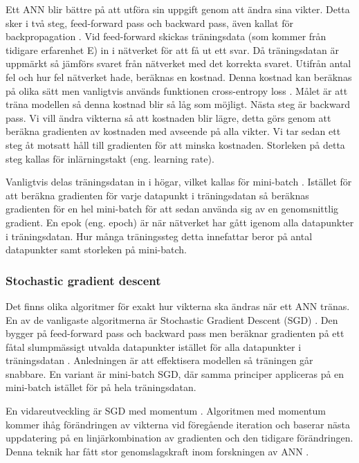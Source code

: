\documentclass[]{kththesis}
\begin{document}
Ett ANN blir bättre på att utföra sin uppgift genom att ändra sina vikter. Detta sker i två steg, feed-forward pass och backward pass, även kallat för backpropagation \parencite{alpaydin2009introduction}. Vid feed-forward skickas träningsdata (som kommer från tidigare erfarenhet E) in i nätverket för att få ut ett svar. Då träningsdatan är uppmärkt så jämförs svaret från nätverket med det korrekta svaret. Utifrån antal fel och hur fel nätverket hade, beräknas en kostnad. Denna kostnad kan beräknas på olika sätt men vanligtvis används funktionen cross-entropy loss \parencite{Goodfellow-et-al-2016}. Målet är att träna modellen så denna kostnad blir så låg som möjligt. Nästa steg är backward pass. Vi vill ändra vikterna så att kostnaden blir lägre, detta görs genom att beräkna gradienten av kostnaden med avseende på alla vikter. Vi tar sedan ett steg åt motsatt håll till gradienten för att minska kostnaden. Storleken på detta steg kallas för inlärningstakt (eng. learning rate).

Vanligtvis delas träningsdatan in i högar, vilket kallas för mini-batch \parencite{Goodfellow-et-al-2016}. Istället för att beräkna gradienten för varje datapunkt i träningsdatan så beräknas gradienten för en hel mini-batch för att sedan använda sig av en genomsnittlig gradient. En epok (eng. epoch) är när nätverket har gått igenom alla datapunkter i träningsdatan. Hur många träningssteg detta innefattar beror på antal datapunkter samt storleken på mini-batch.

\subsubsection{Stochastic gradient descent}
Det finns olika algoritmer för exakt hur vikterna ska ändras när ett ANN tränas. En av de vanligaste algoritmerna är Stochastic Gradient Descent (SGD) \parencite{Goodfellow-et-al-2016}. Den bygger på feed-forward pass och backward pass men beräknar gradienten på ett fåtal slumpmässigt utvalda datapunkter istället för alla datapunkter i träningsdatan \parencite{bottou2010large}. Anledningen är att effektisera modellen så träningen går snabbare. En variant är mini-batch SGD, där samma principer appliceras på en mini-batch istället för på hela träningsdatan.

En vidareutveckling är SGD med momentum \parencite{qian1999momentum}. Algoritmen med momentum kommer ihåg förändringen av vikterna vid föregående iteration och baserar nästa uppdatering på en linjärkombination av gradienten och den tidigare förändringen. Denna teknik har fått stor genomslagskraft inom forskningen av ANN \parencite{sutskever2013importance}.
\end{document}

